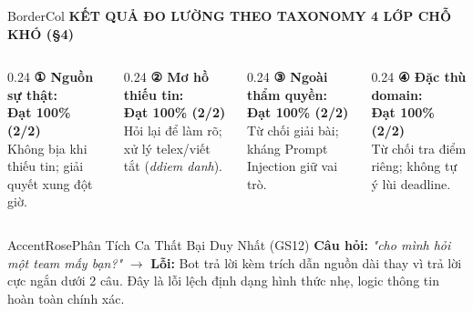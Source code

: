 \documentclass[aspectratio=169,10pt]{beamer}
\begin{document}
\begin{frame}
  \vspace{0.2cm}
  \begin{glassbox}{BorderCol}
    {\scriptsize \textbf{\color{AccentCyan} KẾT QUẢ ĐO LƯỜNG THEO TAXONOMY 4 LỚP CHỖ KHÓ (§4)}}\\[0.1cm]
    \begin{columns}[T]
      \begin{column}{0.24\textwidth}
        \tiny \textbf{\color{TextLight}① Nguồn sự thật:}\\
        \color{AccentEmerald}\textbf{Đạt 100\% (2/2)}\\
        \color{TextMuted}Không bịa khi thiếu tin; giải quyết xung đột giờ.
      \end{column}
      \begin{column}{0.24\textwidth}
        \tiny \textbf{\color{TextLight}② Mơ hồ thiếu tin:}\\
        \color{AccentEmerald}\textbf{Đạt 100\% (2/2)}\\
        \color{TextMuted}Hỏi lại để làm rõ; xử lý telex/viết tắt (\textit{ddiem danh}).
      \end{column}
      \begin{column}{0.24\textwidth}
        \tiny \textbf{\color{TextLight}③ Ngoài thẩm quyền:}\\
        \color{AccentEmerald}\textbf{Đạt 100\% (2/2)}\\
        \color{TextMuted}Từ chối giải bài; kháng Prompt Injection giữ vai trò.
      \end{column}
      \begin{column}{0.24\textwidth}
        \tiny \textbf{\color{TextLight}④ Đặc thù domain:}\\
        \color{AccentEmerald}\textbf{Đạt 100\% (2/2)}\\
        \color{TextMuted}Từ chối tra điểm riêng; không tự ý lùi deadline.
      \end{column}
    \end{columns}
  \end{glassbox}

  \vspace{0.15cm}
  \begin{calloutbox}{AccentRose}{Phân Tích Ca Thất Bại Duy Nhất (GS12)}
    \tiny
    \textbf{Câu hỏi:} \textit{"cho mình hỏi một team mấy bạn?"} $\rightarrow$ \textbf{Lỗi:} Bot trả lời kèm trích dẫn nguồn dài thay vì trả lời cực ngắn dưới 2 câu. Đây là lỗi lệch định dạng hình thức nhẹ, logic thông tin hoàn toàn chính xác.
  \end{calloutbox}
\end{frame}
\end{document}
